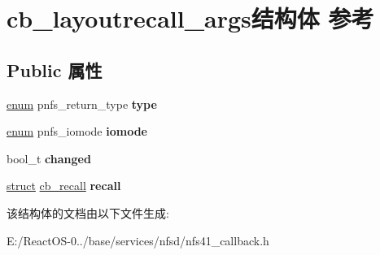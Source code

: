 \hypertarget{structcb__layoutrecall__args}{}\section{cb\+\_\+layoutrecall\+\_\+args结构体 参考}
\label{structcb__layoutrecall__args}
\subsection*{Public 属性}
\begin{DoxyCompactItemize}
\item 
\mbox{\label{structcb__layoutrecall__args_ae733f8dad452337b47efe271dcd8bef5}} 
\hyperlink{interfaceenum}{enum} pnfs\+\_\+return\+\_\+type {\bfseries type}
\item 
\mbox{\label{structcb__layoutrecall__args_a3089ca7cde925d754314a41bb680538f}} 
\hyperlink{interfaceenum}{enum} pnfs\+\_\+iomode {\bfseries iomode}
\item 
\mbox{\label{structcb__layoutrecall__args_a8a43220e77ebb479feaeadf354fad4c0}} 
bool\+\_\+t {\bfseries changed}
\item 
\mbox{\label{structcb__layoutrecall__args_a07c01f8bf3e57c37c7e7a82046ebacdc}} 
\hyperlink{interfacestruct}{struct} \hyperlink{structcb__recall}{cb\+\_\+recall} {\bfseries recall}
\end{DoxyCompactItemize}


该结构体的文档由以下文件生成\+:\begin{DoxyCompactItemize}
\item 
E\+:/\+React\+O\+S-\/0../base/services/nfsd/nfs41\+\_\+callback.\+h\end{DoxyCompactItemize}
